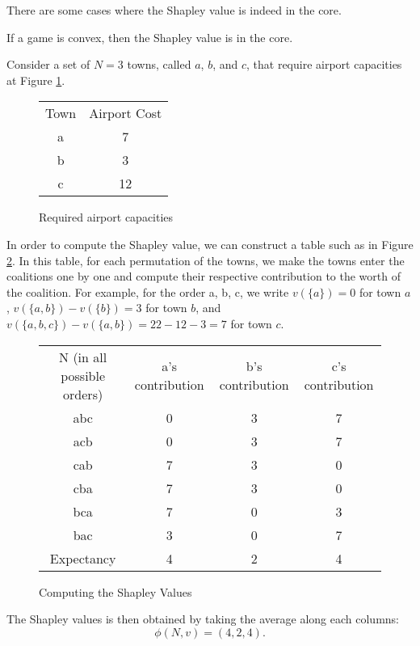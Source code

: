 There are some cases where the Shapley value is indeed in the core.
\begin{theorem}
If a game is convex, then the Shapley value is in the core.
\end{theorem}
\begin{example}
Consider a set of $N = 3$ towns, called $a$, $b$, and $c$, that require airport capacities at Figure \ref{fig:capacities}.
\begin{figure}[!ht]
\centering
\begin{tabular}{c|c}
Town & Airport Cost \\
a & 7  \\
b & 3 \\
c & 12 \\
\end{tabular}
\caption{Required airport capacities}
\label{fig:capacities}
\end{figure}

In order to compute the Shapley value, we can construct a table such as in Figure \ref{shapleyTable}.
In this table, for each permutation of the towns, we make the towns enter the coalitions one by one and compute their respective contribution to the worth of the coalition. For example, for the order
a, b, c, we write $v(\{a\}) = 0$ for town $a$, $v(\{a,b\}) - v(\{b\}) = 3$ for town $b$, and $v(\{a,b,c\}) - v(\{a,b\}) = 22 - 12  - 3 = 7$ for town $c$.

\begin{figure}[!ht]
\centering
\begin{tabular}{c||c | c | c}
N (in all possible orders) & a's contribution &  b's contribution   &  c's contribution\\
abc & 0 & 3 & 7\\
acb & 0 & 3 & 7\\
cab & 7 & 3 & 0\\
cba & 7 & 3 & 0 \\
bca & 7 & 0 & 3 \\
bac & 3 & 0 & 7 \\
\hline Expectancy & 4 & 2 & 4
\end{tabular}
\caption{Computing the Shapley Values}
\label{shapleyTable}
\end{figure}
The Shapley values is then obtained by taking the average along each columns:
$$\phi (N, v) = (4,2,4). $$


\end{example}




\ifx \globalmark \undefined %


	
\else

\fi
